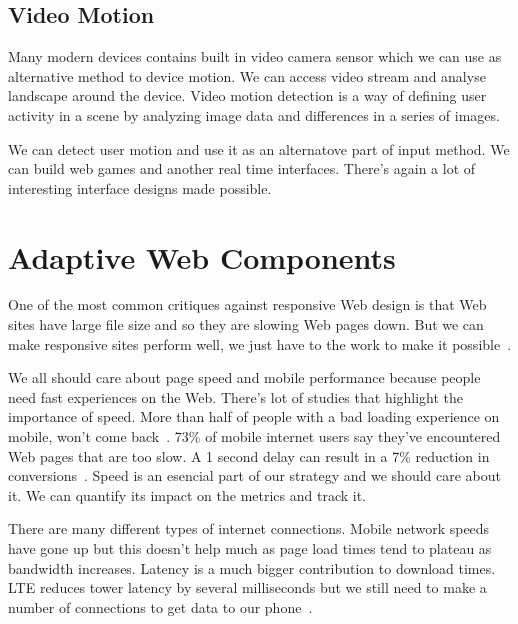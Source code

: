 \documentclass{iitsrc}
\begin{document}

\subsection{Video Motion} %
\label{sub:video_motion}

Many modern devices contains built in video camera sensor which we can use as alternative method to device motion. We can access video stream and analyse landscape around the device. Video motion detection is a way of defining user activity in a scene by analyzing image data and differences in a series of images.

We can detect user motion and use it as an alternatove part of input method. We can build web games and another real time interfaces. There's again a lot of interesting interface designs made possible.


\section{Adaptive Web Components} %
\label{sec:adaptive_web_components}

One of the most common critiques against responsive Web design is that Web sites have large file size and so they are slowing Web pages down. But we can make responsive sites perform well, we just have to the work to make it possible~\cite{20mb}.

We all should care about page speed and mobile performance because people need fast experiences on the Web. There's lot of studies that highlight the importance of speed. More than half of people with a bad loading experience on mobile, won't come back~\cite{performancebrowsernetworking}. 73\% of mobile internet users say they've encountered Web pages that are too slow. A 1 second delay can result in a 7\% reduction in conversions~\cite{pagespeed}. Speed is an esencial part of our strategy and we should care about it. We can quantify its impact on the metrics and track it.

There are many different types of internet connections. Mobile network speeds have gone up but this doesn't help much as page load times tend to plateau as bandwidth increases. Latency is a much bigger contribution to download times. LTE reduces tower latency by several milliseconds but we still need to make a number of connections to get data to our phone~\cite{performancebrowsernetworking}.
\end{document}
